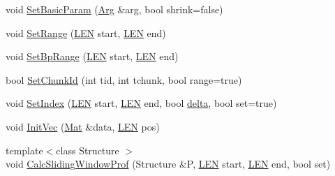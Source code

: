 \begin{DoxyCompactItemize}
\item 
void \hyperlink{class_rfold_1_1_paraso_r_ae6e89ca3ece9760c24461ff5509b6409}{Set\+Basic\+Param} (\hyperlink{class_rfold_1_1_arg}{Arg} \&arg, bool shrink=false)
\item 
void \hyperlink{class_rfold_1_1_paraso_r_a84862289410d1791da040db720a4b4fa}{Set\+Range} (\hyperlink{energy__const_8hh_a05b49c662c073f89e86804f7856622a0}{L\+E\+N} start, \hyperlink{energy__const_8hh_a05b49c662c073f89e86804f7856622a0}{L\+E\+N} end)
\item 
void \hyperlink{class_rfold_1_1_paraso_r_a957949c0106b4f407f721c276495f36f}{Set\+Bp\+Range} (\hyperlink{energy__const_8hh_a05b49c662c073f89e86804f7856622a0}{L\+E\+N} start, \hyperlink{energy__const_8hh_a05b49c662c073f89e86804f7856622a0}{L\+E\+N} end)
\item 
bool \hyperlink{class_rfold_1_1_paraso_r_afffab65a875eb42915009928f9870fde}{Set\+Chunk\+Id} (int tid, int tchunk, bool range=true)
\item 
void \hyperlink{class_rfold_1_1_paraso_r_a4949ca5e68852ce1142fe310c595f3b4}{Set\+Index} (\hyperlink{energy__const_8hh_a05b49c662c073f89e86804f7856622a0}{L\+E\+N} start, \hyperlink{energy__const_8hh_a05b49c662c073f89e86804f7856622a0}{L\+E\+N} end, bool \hyperlink{class_rfold_1_1_paraso_r_ac0a808250ee05c1f56b5be32d867f11e}{delta}, bool set=true)
\item 
void \hyperlink{class_rfold_1_1_paraso_r_a8d5e46c0bed60e2732c7c8417d4a8e56}{Init\+Vec} (\hyperlink{namespace_rfold_a6392dbfbc164230455fdcdb1a0ff53d7}{Mat} \&data, \hyperlink{energy__const_8hh_a05b49c662c073f89e86804f7856622a0}{L\+E\+N} pos)
\item 
{\footnotesize template$<$class Structure $>$ }\\void \hyperlink{class_rfold_1_1_paraso_r_a9ab821464d8b2d99e1923270b79a1851}{Calc\+Sliding\+Window\+Prof} (Structure \&P, \hyperlink{energy__const_8hh_a05b49c662c073f89e86804f7856622a0}{L\+E\+N} start, \hyperlink{energy__const_8hh_a05b49c662c073f89e86804f7856622a0}{L\+E\+N} end, bool set)
\end{DoxyCompactItemize}
